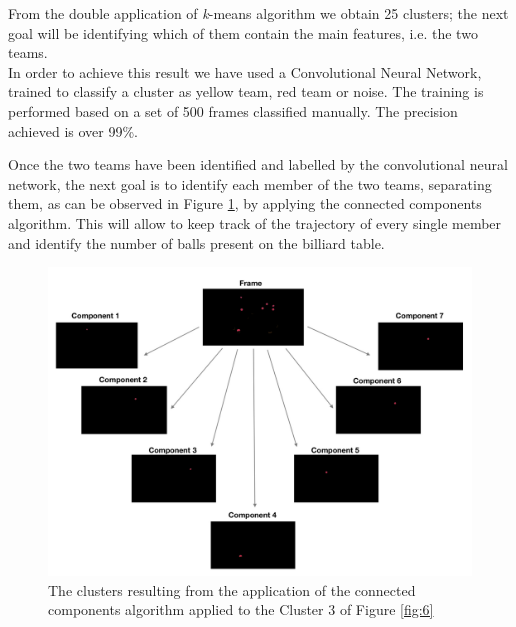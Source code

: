 \documentclass{usiinftr}
\begin{document}
\noindent
From the double application of \textit{k}-means algorithm we obtain 25 clusters; the next goal will be identifying which of them contain the main features, i.e. the two teams. \\
In order to achieve this result we have used a Convolutional Neural Network, trained to classify a cluster as yellow team, red team or noise. The training is performed based on a set of 500 frames classified manually. The precision achieved is over 99\%.

\noindent
Once the two teams have been identified and labelled by the convolutional neural network, the next goal is to identify each member of the two teams, separating them, as can be observed in Figure \ref{fig:7}, by applying the connected components algorithm. This will allow to keep track of the trajectory of every single member and identify the number of balls present on the billiard table.
\begin{figure}[h]
	\centering
	\includegraphics[width=0.8\linewidth]{./img/cc}
	\caption{The clusters resulting from the application of the connected components algorithm applied to the Cluster 3 of Figure \ref{fig:6}}
	\label{fig:7}
\end{figure}
\end{document}
